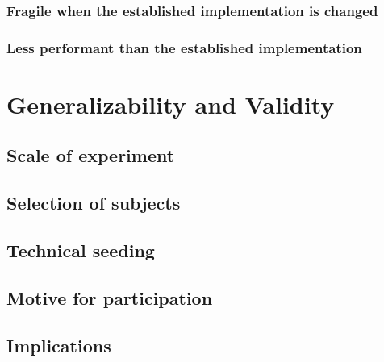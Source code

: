 \subsubsection{Fragile when the established implementation is changed}

\subsubsection{Less performant than the established implementation}

\section{Generalizability and Validity}

\subsection{Scale of experiment}


\subsection{Selection of subjects}


\subsection{Technical seeding}


\subsection{Motive for participation}


\subsection{Implications}

